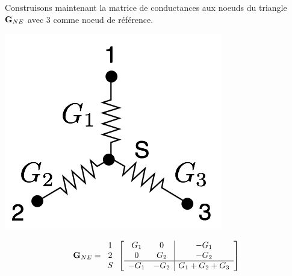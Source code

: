 \begin{testexample}
Construisons maintenant la matrice de conductances aux noeuds du triangle ${\bf G}_{NE}$ avec $3$ comme noeud de référence.
\begin{center}
	\begin{minipage}[c]{0.33 \textwidth}
		\begin{center}
			\includegraphics[width=0.9\linewidth]{figs/methodes-generales/e2t_1}
		\end{center}
	\end{minipage}
	\begin{minipage}[c]{0.66 \textwidth}
	\[{\bf G}_{NE}=
	\begin{array}{c}
	1 \\2 \\S
	\end{array}
	\left[
	\begin{array}{cc|c}
	G_1 & 0 & -G_1\\
	0 & G_2 & -G_2\\ \hline
	-G_1 & -G_2 & G_1+G_2+G_3
	\end{array} \right]\]
	\end{minipage}
\end{center}
	

\end{testexample}
